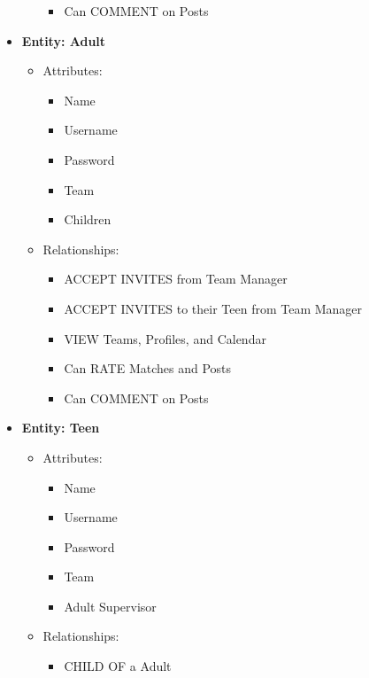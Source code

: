 \documentclass{article}
\begin{document}
\begin{itemize}
\begin{itemize}
\begin{itemize}
                    \item Can COMMENT on Posts
                \end{itemize}
        \end{itemize}
    \item \textbf{Entity: Adult}
        \begin{itemize}
            \item Attributes:
                \begin{itemize}
                    \item Name
                    \item Username
                    \item Password
                    \item Team
                    \item Children
                \end{itemize}
            \item Relationships:
                \begin{itemize}
                    \item ACCEPT INVITES from Team Manager
                    \item ACCEPT INVITES to their Teen from Team Manager
                    \item VIEW Teams, Profiles, and Calendar
                    \item Can RATE Matches and Posts
                    \item Can COMMENT on Posts
                \end{itemize}
        \end{itemize}
    \item \textbf{Entity: Teen}
        \begin{itemize}
            \item Attributes:
                \begin{itemize}
                    \item Name
                    \item Username
                    \item Password
                    \item Team
                    \item Adult Supervisor
                \end{itemize}
            \item Relationships:
                \begin{itemize}
                    \item CHILD OF a Adult

\end{itemize}
\end{itemize}
\end{itemize}
\end{document}
